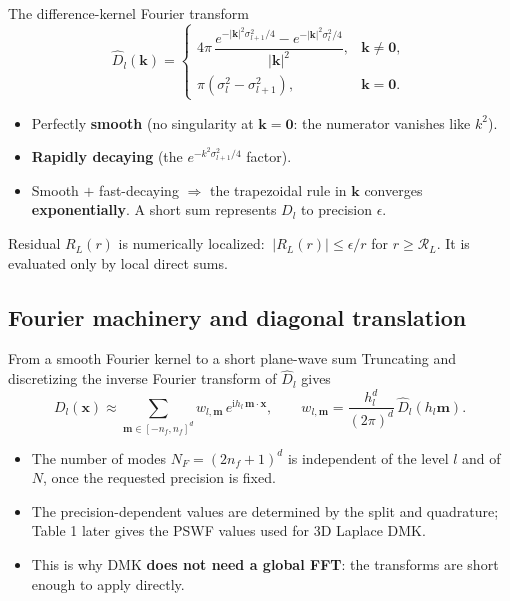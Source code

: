 \documentclass[aspectratio=169,11pt]{beamer}
\newcommand{\cR}{\mathcal{R}}
\newcommand{\ii}{\mathrm i}
\newcommand{\x}{\bm{x}}
\newcommand{\kk}{\bm{k}}
\newcommand{\mm}{\bm{m}}
\newcommand{\hl}[1]{{\color{CCMorange}\textbf{#1}}}
\begin{document}
\begin{frame}{The difference-kernel Fourier transform}
\small
\[
  \widehat D_l(\kk)=
  \begin{cases}
    4\pi\,\dfrac{e^{-|\kk|^2\sigma_{l+1}^2/4}-e^{-|\kk|^2\sigma_l^2/4}}{|\kk|^2}, & \kk\neq\bm0,\\[8pt]
    \pi(\sigma_l^2-\sigma_{l+1}^2), & \kk=\bm0.
  \end{cases}
\]
\begin{itemize}
  \item Perfectly \hl{smooth} (no singularity at \(\kk=\bm0\): the numerator vanishes like \(k^2\)).
  \item \hl{Rapidly decaying} (the \(e^{-k^2\sigma_{l+1}^2/4}\) factor).
  \item Smooth \(+\) fast-decaying \(\Rightarrow\) the trapezoidal rule in \(\kk\) converges \hl{exponentially}. A short sum represents \(D_l\) to precision \(\epsilon\).
\end{itemize}
\begin{block}{Residual}
\(R_L(r)\) is numerically localized: \(\ |R_L(r)|\le \epsilon/r\) for \(r\ge\cR_L\). It is evaluated only by local direct sums.
\end{block}
\end{frame}

\subsection{Fourier machinery and diagonal translation}

\begin{frame}{From a smooth Fourier kernel to a short plane-wave sum}
\small
Truncating and discretizing the inverse Fourier transform of \(\widehat D_l\) gives
\[
  D_l(\x)\approx\sum_{\mm\in[-n_f,n_f]^d} w_{l,\mm}\,e^{\ii h_l\,\mm\cdot\x},\qquad
  w_{l,\mm}=\frac{h_l^d}{(2\pi)^d}\,\widehat D_l(h_l\mm).
\]
\begin{itemize}
  \item The number of modes \(N_F=(2n_f+1)^d\) is independent of the level \(l\) and of \(N\), once the requested precision is fixed.
  \item The precision-dependent values are determined by the split and quadrature; Table 1 later gives the PSWF values used for 3D Laplace DMK.
  \item This is why DMK \hl{does not need a global FFT}: the transforms are short enough to apply directly.
\end{itemize}
\end{frame}
\end{document}
